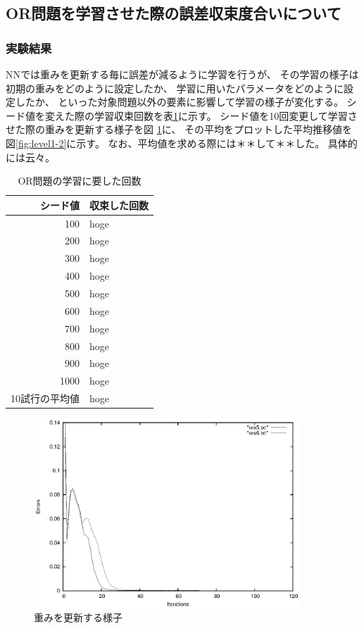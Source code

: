 \subsection{OR問題を学習させた際の誤差収束度合いについて}
\subsubsection{実験結果}
NNでは重みを更新する毎に誤差が減るように学習を行うが、
その学習の様子は初期の重みをどのように設定したか、
学習に用いたパラメータをどのように設定したか、
といった対象問題以外の要素に影響して学習の様子が変化する。
シード値を変えた際の学習収束回数を表\ref{table:level1}に示す。
シード値を10回変更して学習させた際の重みを更新する様子を図
\ref{fig:level1-1}に、
その平均をプロットした平均推移値を図\ref{fig:level1-2}に示す。
なお、平均値を求める際には＊＊して＊＊した。
具体的には云々。

\begin{table}[htb]
 \begin{center}
  \caption{OR問題の学習に要した回数}
  \label{table:level1}
  \begin{tabular}[htb]{r|l} \hline
   シード値 & 収束した回数 \\ \hline \hline
   100 & hoge \\ \hline
   200 & hoge \\ \hline
   300 & hoge \\ \hline
   400 & hoge \\ \hline
   500 & hoge \\ \hline
   600 & hoge \\ \hline
   700 & hoge \\ \hline
   800 & hoge \\ \hline
   900 & hoge \\ \hline
   1000 & hoge \\ \hline \hline
   10試行の平均値 & hoge \\ \hline
  \end{tabular}
 \end{center}
\end{table}


\begin{figure}[h]
 \begin{center}
  \includegraphics[width=10.0cm]{figs/sample1.eps}
  \caption{重みを更新する様子}
  \label{fig:level1-1}
 \end{center}
\end{figure}

